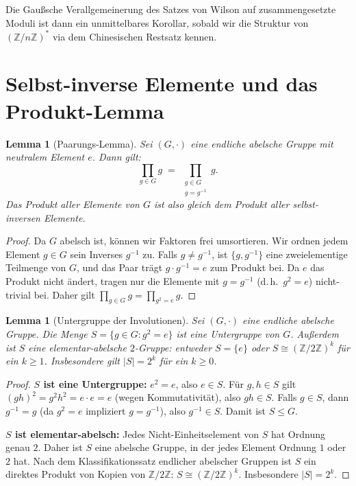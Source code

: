 \documentclass[12pt,a4paper]{amsart}
\newtheorem{lemma}[theorem]{Lemma}
\theoremstyle{definition}
\newcommand{\Z}{\mathbb{Z}}
\begin{document}
Die Gaußsche Verallgemeinerung des Satzes von Wilson auf zusammengesetzte Moduli
ist dann ein unmittelbares Korollar, sobald wir die Struktur von $(\Z/n\Z)^*$
via dem Chinesischen Restsatz kennen.

\section{Selbst-inverse Elemente und das Produkt-Lemma}

\begin{lemma}[Paarungs-Lemma]\label{lem:paarung}
  Sei $(G, \cdot)$ eine endliche abelsche Gruppe mit neutralem Element $e$. Dann gilt:
  \[
    \prod_{g \in G} g \;=\; \prod_{\substack{g \in G \\ g = g^{-1}}} g.
  \]
  Das Produkt aller Elemente von $G$ ist also gleich dem Produkt aller
  selbst-inversen Elemente.
\end{lemma}

\begin{proof}
  Da $G$ abelsch ist, können wir Faktoren frei umsortieren.
  Wir ordnen jedem Element $g \in G$ sein Inverses $g^{-1}$ zu.
  Falls $g \neq g^{-1}$, ist $\{g, g^{-1}\}$ eine zweielementige Teilmenge
  von $G$, und das Paar trägt $g \cdot g^{-1} = e$ zum Produkt bei.
  Da $e$ das Produkt nicht ändert, tragen nur die Elemente mit $g = g^{-1}$
  (d.\,h.\ $g^2 = e$) nicht-trivial bei.
  Daher gilt $\prod_{g \in G} g = \prod_{g^2=e} g$.
\end{proof}

\begin{lemma}[Untergruppe der Involutionen]\label{lem:untergruppe}
  Sei $(G, \cdot)$ eine endliche abelsche Gruppe. Die Menge
  $S = \{g \in G : g^2 = e\}$ ist eine Untergruppe von $G$. Außerdem ist
  $S$ eine elementar-abelsche $2$-Gruppe: entweder $S = \{e\}$ oder
  $S \cong (\Z/2\Z)^k$ für ein $k \geq 1$. Insbesondere gilt $|S| = 2^k$
  für ein $k \geq 0$.
\end{lemma}

\begin{proof}
  \textbf{$S$ ist eine Untergruppe:} $e^2 = e$, also $e \in S$.
  Für $g, h \in S$ gilt $(gh)^2 = g^2 h^2 = e \cdot e = e$ (wegen Kommutativität),
  also $gh \in S$. Falls $g \in S$, dann $g^{-1} = g$ (da $g^2 = e$ impliziert
  $g = g^{-1}$), also $g^{-1} \in S$. Damit ist $S \leq G$.

  \textbf{$S$ ist elementar-abelsch:} Jedes Nicht-Einheitselement von $S$ hat
  Ordnung genau $2$. Daher ist $S$ eine abelsche Gruppe, in der jedes Element
  Ordnung $1$ oder $2$ hat. Nach dem Klassifikationssatz endlicher abelscher
  Gruppen ist $S$ ein direktes Produkt von Kopien von $\Z/2\Z$:
  $S \cong (\Z/2\Z)^k$. Insbesondere $|S| = 2^k$.
\end{proof}
\end{document}

